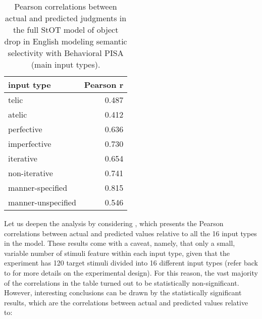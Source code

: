 \begin{table}[htb] %
\caption{Pearson correlations between actual and predicted judgments in the full StOT model of object drop in English modeling semantic selectivity with Behavioral PISA (main input types).}
\begin{tabular}{l|r}
\textbf{input type} & \textbf{Pearson r}\\
\hline
telic               & 0.487 \\
atelic              & 0.412 \\
perfective          & 0.636 \\
imperfective        & 0.730 \\
iterative           & 0.654 \\
non-iterative       & 0.741 \\
manner-specified    & 0.815 \\
manner-unspecified  & 0.546
\end{tabular}
\end{table}


Let us deepen the analysis by considering , which presents the Pearson correlations between actual and predicted values relative to all the 16 input types in the model. These results come with a caveat, namely, that only a small, variable number of stimuli feature within each input type, given that the experiment has 120 target stimuli divided into 16 different input types (refer back to  for more details on the experimental design). For this reason, the vast majority of the correlations in the table turned out to be statistically non-significant.\\
However, interesting conclusions can be drawn by the statistically significant results, which are the correlations between actual and predicted values relative to:

